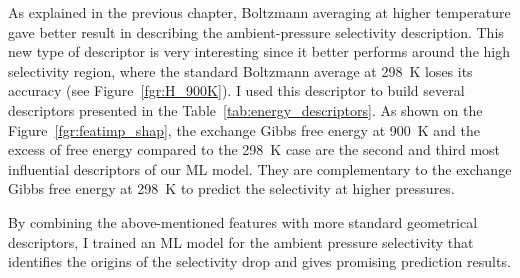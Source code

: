 \documentclass[main]{subfiles}
\begin{document}
As explained in the previous chapter, Boltzmann averaging at higher temperature gave better result in describing the ambient-pressure selectivity description. 
This new type of descriptor is very interesting since it better performs around the high selectivity region, where the standard Boltzmann average at \SI{298}{\kelvin} loses its accuracy (see Figure~\ref{fgr:H_900K}). I used this descriptor to build several descriptors presented in the Table~\ref{tab:energy_descriptors}. As shown on the Figure~\ref{fgr:featimp_shap}, the exchange Gibbs free energy at \SI{900}{\kelvin} and the excess of free energy compared to the \SI{298}{\kelvin} case are the second and third most influential descriptors of our ML model. They are complementary to the exchange Gibbs free energy at \SI{298}{\kelvin} to predict the selectivity at higher pressures.

By combining the above-mentioned features with more standard geometrical descriptors, I trained an ML model for the ambient pressure selectivity that identifies the origins of the selectivity drop and gives promising prediction results.

\clearpage
\end{document}
